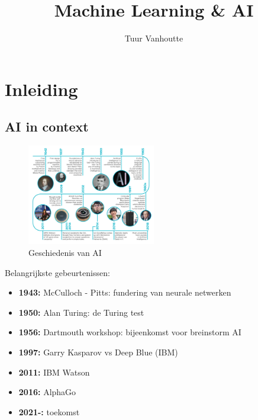 \documentclass{article}
\begin{document}
\begin{titlepage}
    \author{Tuur Vanhoutte}
    \title{Machine Learning \& AI}
\end{titlepage}

\maketitle
\newpage
\tableofcontents
\newpage


\section{Inleiding}

\subsection{AI in context}

\begin{figure}[H]
    \centering
    \includegraphics[width=0.5\textwidth]{ai-history.png}
    \caption{Geschiedenis van AI}
\end{figure}

Belangrijkste gebeurtenissen:

\begin{itemize}
    \item \textbf{1943:} McCulloch - Pitts: fundering van neurale netwerken
    \item \textbf{1950:} Alan Turing: de Turing test
    \item \textbf{1956:} Dartmouth workshop: bijeenkomst voor breinstorm AI
    \item \textbf{1997:} Garry Kasparov vs Deep Blue (IBM)
    \item \textbf{2011:} IBM Watson
    \item \textbf{2016:} AlphaGo
    \item \textbf{2021-:} toekomst
\end{itemize}
\end{document}
